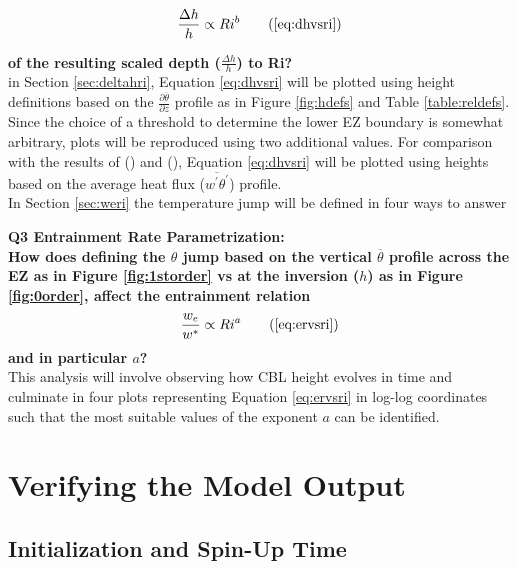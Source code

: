 \begin{equation}
\frac{\Delta h}{h} \propto Ri^{b}\tag{\ref{eq:dhvsri}}
\end{equation}

\textbf{of the resulting scaled depth ($\frac{\Delta h}{h}$) to \acs{Ri}?}\\

in Section \ref{sec:deltahri}, Equation \ref{eq:dhvsri} will be plotted using height definitions based on the $\frac{\partial \overline{\theta}}{\partial z}$ profile as in Figure \ref{fig:hdefs} and Table \ref{table:reldefs}.  Since the choice of a threshold to determine the lower \acs{EZ} boundary is somewhat arbitrary, plots will be reproduced using two additional values. For comparison with the results of \citeauthor{FedConzMir04} (\citeyear{FedConzMir04}) and \citeauthor{BrooksFowler2} (\citeyear{BrooksFowler2}), Equation \ref{eq:dhvsri} will be plotted using heights based on the average heat flux ($\overline{w^{'}\theta^{'}}$) profile.\\   

In Section \ref{sec:weri} the temperature jump will be defined in four ways to answer 

\textbf{Q3 Entrainment Rate Parametrization:}\\
 
\textbf{How does defining the $\theta$ jump based on the vertical $\overline{\theta}$ profile across the \acs{EZ} as in Figure \ref{fig:1storder} vs at the inversion ($h$) as in Figure \ref{fig:0order}, affect the entrainment relation}
 \begin{equation}
\frac{w_{e}}{w^{*}} \propto Ri^{a} \tag{\ref{eq:ervsri}}
\end{equation}
\textbf{and in particular $a$?}\\

This analysis will involve observing how \acs{CBL} height evolves in time and culminate in four plots representing Equation \ref{eq:ervsri} in log-log coordinates such that the most suitable values of the exponent $a$ can be identified. 
\\ 

\clearpage

\section{Verifying the Model Output}
\label{sec:CheckingtheModel}
\subsection{Initialization and Spin-Up Time}%
\FloatBarrier

